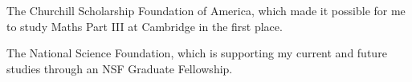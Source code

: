 \documentclass{amsart}
\theoremstyle{definition}
\theoremstyle{remark}
\numberwithin{equation}{section}
\begin{document}
The Churchill Scholarship Foundation of America, which made it possible for me to study Maths Part III at Cambridge in the first place.

The National Science Foundation, which is supporting my current and future studies through an NSF Graduate Fellowship.


\nocite{SilvermanAEC}
\nocite{SilvermanATAEC}
\nocite{CoxPrimes}
\nocite{LangEF}
\nocite{SutherlandLN}
\nocite{SutherlandIV}



\end{document}
